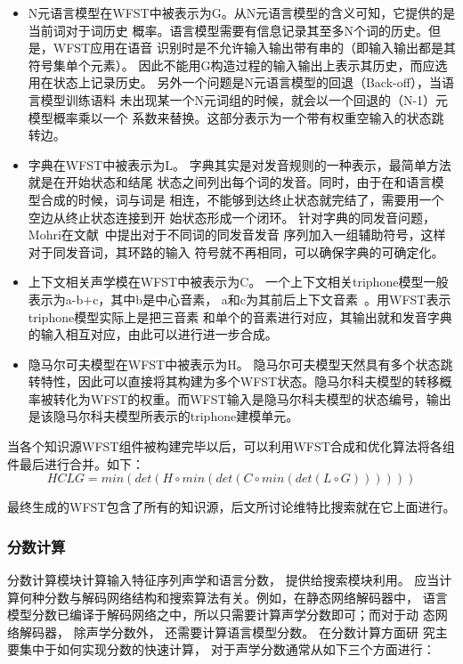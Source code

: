 \begin{itemize}
\item N元语言模型在WFST中被表示为G。从N元语言模型的含义可知，它提供的是当前词对于词历史
概率。语言模型需要有信息记录其至多N个词的历史。但是，WFST应用在语音
识别时是不允许输入输出带有串的（即输入输出都是其符号集单个元素）。
因此不能用G构造过程的输入输出上表示其历史，而应选用在状态上记录历史。
另外一个问题是N元语言模型的回退（Back-off），当语言模型训练语料
未出现某一个N元词组的时候，就会以一个回退的（N-1）元模型概率乘以一个
系数来替换。这部分表示为一个带有权重空输入的状态跳转边。

\item 字典在WFST中被表示为L。
字典其实是对发音规则的一种表示，最简单方法就是在开始状态和结尾
状态之间列出每个词的发音。同时，由于在和语言模型合成的时候，词与词是
相连，不能够到达终止状态就完结了，需要用一个空边从终止状态连接到开
始状态形成一个闭环。
针对字典的同发音问题，Mohri在文献~\cite{mohri2002weighted}中提出对于不同词的同发音发音
序列加入一组辅助符号，这样对于同发音词，其环路的输入
符号就不再相同，可以确保字典的可确定化。

\item 上下文相关声学模在WFST中被表示为C。
一个上下文相关triphone模型一般表示为a-b+c，其中b是中心音素，
a和c为其前后上下文音素~\cite{seide2011conversational}。用WFST表示triphone模型实际上是把三音素
和单个的音素进行对应，其输出就和发音字典的输入相互对应，由此可以进行进一步合成。

\item 隐马尔可夫模型在WFST中被表示为H。
隐马尔可夫模型天然具有多个状态跳转特性，因此可以直接将其构建为多个WFST状态。隐马尔科夫模型的转移概率被转化为WFST的权重。而WFST输入是隐马尔科夫模型的状态编号，输出是该隐马尔科夫模型所表示的triphone建模单元。
\end{itemize}

当各个知识源WFST组件被构建完毕以后，可以利用WFST合成和优化算法将各组件最后进行合并。如下：
\begin{equation}
HCLG = min(det(H \circ min(det(C \circ min(det(L \circ G))))))
\end{equation}

最终生成的WFST包含了所有的知识源，后文所讨论维特比搜索就在它上面进行。

\subsubsection{分数计算}

分数计算模块计算输入特征序列声学和语言分数， 提供给搜索模块利用。
应当计算何种分数与解码网络结构和搜索算法有关。例如，在静态网络解码器中，
语言模型分数已编译于解码网络之中，所以只需要计算声学分数即可；而对于动
态网络解码器， 除声学分数外， 还需要计算语言模型分数。 在分数计算方面研
究主要集中于如何实现分数的快速计算， 对于声学分数通常从如下三个方面进行：

